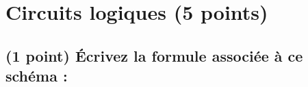 \documentclass[11pt,a4paper]{article}
\begin{document}
\bigskip



\section{Circuits logiques (5 points)}

\subsection{(1 point) \'Ecrivez la formule associée à ce schéma : }

\smallskip

\begin{figure}[ht!]
\end{figure}


\clearpage
\end{document}
